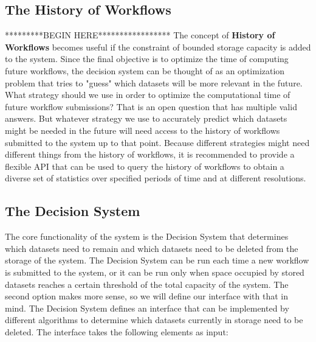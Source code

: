 \subsection{The History of Workflows}
*********BEGIN HERE*****************
The concept of \textbf{History of Workflows} becomes useful if the constraint of bounded storage capacity is added to the system. Since the final objective is to optimize the time of computing future workflows, the decision system can be thought of as an optimization problem that tries to "guess" which datasets will be more relevant in the future. What strategy should we use in order to optimize the computational time of future workflow submissions?  That is an open question that has multiple valid answers.  But whatever strategy we use to accurately predict which datasets might be needed in the future will need access to the history of workflows submitted to the system up to that point.  Because different strategies might need different things from the history of workflows, it is recommended to provide a flexible API that can be used to query the history of workflows to obtain a diverse set of statistics over specified periods of time and at different resolutions.

\subsection{The Decision System}
\label{sec:decision_system}
The core functionality of the system is the Decision System that determines which datasets need to remain and which datasets need to be deleted from the storage of the system.  The Decision System can be run each time a new workflow is submitted to the system, or it can be run only when space occupied by stored datasets reaches a certain threshold of the total capacity of the system. The second option makes more sense, so we will define our interface with that in mind. The Decision System defines an interface that can be implemented by different algorithms to determine which datasets currently in storage need to be deleted. The interface takes the following elements as input:

